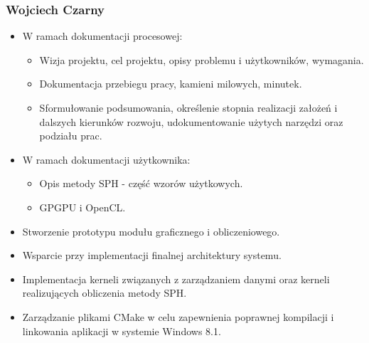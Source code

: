 \documentclass[polish, 12pt]{aghthesis}
\begin{document}
	\subsubsection*{Wojciech Czarny} 
		
		\begin{itemize}
			
			\item W ramach dokumentacji procesowej:
			
				\begin{itemize}
				
					\item Wizja projektu, cel projektu, opisy problemu i użytkowników, wymagania.
					
					\item Dokumentacja przebiegu pracy, kamieni milowych, minutek.
					
					\item Sformułowanie podsumowania, określenie stopnia realizacji założeń i dalszych kierunków rozwoju, udokumentowanie użytych narzędzi oraz podziału prac.
				
				\end{itemize}
			
			\item W ramach dokumentacji użytkownika:
			
				\begin{itemize}
				
					\item Opis metody SPH - część wzorów użytkowych.
					
					\item GPGPU i OpenCL.
				
				\end{itemize}
			
			\item Stworzenie prototypu modułu graficznego i obliczeniowego.
			
			\item Wsparcie przy implementacji finalnej architektury systemu.
			
			\item Implementacja kerneli związanych z zarządzaniem danymi oraz kerneli realizujących obliczenia metody SPH.
					
			\item Zarządzanie plikami CMake w celu zapewnienia poprawnej kompilacji i linkowania aplikacji w systemie Windows 8.1.
		
		\end{itemize}
		
\end{document}
